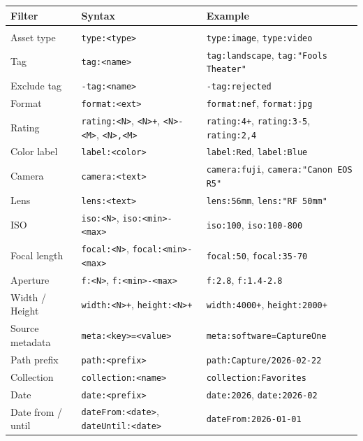 \documentclass[a4paper,10pt]{extarticle}
\newcommand{\cmd}[1]{\texttt{#1}}
\begin{document}
\renewcommand{\arraystretch}{1.3}
\begin{tabularx}{\textwidth}{@{}l l X@{}}
\textbf{Filter} & \textbf{Syntax} & \textbf{Example} \\[3pt]
\hline\\[-6pt]
Asset type          & \cmd{type:<type>}                     & \cmd{type:image}, \cmd{type:video} \\
Tag                 & \cmd{tag:<name>}                      & \cmd{tag:landscape}, \cmd{tag:"Fools Theater"} \\
Exclude tag         & \cmd{-tag:<name>}                     & \cmd{-tag:rejected} \\
Format              & \cmd{format:<ext>}                    & \cmd{format:nef}, \cmd{format:jpg} \\
Rating              & \cmd{rating:<N>}, \cmd{<N>+}, \cmd{<N>-<M>}, \cmd{<N>,<M>} & \cmd{rating:4+}, \cmd{rating:3-5}, \cmd{rating:2,4} \\
Color label         & \cmd{label:<color>}                   & \cmd{label:Red}, \cmd{label:Blue} \\
Camera              & \cmd{camera:<text>}                   & \cmd{camera:fuji}, \cmd{camera:"Canon EOS R5"} \\
Lens                & \cmd{lens:<text>}                     & \cmd{lens:56mm}, \cmd{lens:"RF 50mm"} \\
ISO                 & \cmd{iso:<N>}, \cmd{iso:<min>-<max>}  & \cmd{iso:100}, \cmd{iso:100-800} \\
Focal length        & \cmd{focal:<N>}, \cmd{focal:<min>-<max>} & \cmd{focal:50}, \cmd{focal:35-70} \\
Aperture            & \cmd{f:<N>}, \cmd{f:<min>-<max>}      & \cmd{f:2.8}, \cmd{f:1.4-2.8} \\
Width / Height      & \cmd{width:<N>+}, \cmd{height:<N>+}   & \cmd{width:4000+}, \cmd{height:2000+} \\
Source metadata     & \cmd{meta:<key>=<value>}              & \cmd{meta:software=CaptureOne} \\
Path prefix         & \cmd{path:<prefix>}                   & \cmd{path:Capture/2026-02-22} \\
Collection          & \cmd{collection:<name>}               & \cmd{collection:Favorites} \\
Date                & \cmd{date:<prefix>}                   & \cmd{date:2026}, \cmd{date:2026-02} \\
Date from / until   & \cmd{dateFrom:<date>}, \cmd{dateUntil:<date>} & \cmd{dateFrom:2026-01-01} \\

\end{tabularx}
\end{document}
